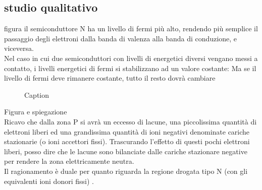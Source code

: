 \subsection{studio qualitativo}
figura
il semiconduttore N ha un livello di fermi più alto, rendendo più semplice il passaggio degli elettroni dalla banda di valenza alla banda di conduzione, e viceversa.\\
Nel caso in cui due semiconduttori con livelli di energetici diversi vengano messi a contatto, i livelli energetici di fermi si stabilizzano ad un valore costante:
Ma se il livello di fermi deve rimanere costante, tutto il resto dovrà cambiare\\
\begin{figure}[hbt!]
    \centering
    \caption{Caption}%
    \label{fig:enter_label}
\end{figure}
Figura e spiegazione\\
Ricavo che dalla zona P si avrà un eccesso di lacune, una piccolissima quantità di elettroni liberi ed una grandissima quantità di ioni negativi denominate cariche stazionarie (o ioni accettori fissi). Trascurando l'effetto di questi pochi elettroni liberi, posso dire che le lacune sono bilanciate dalle cariche stazionare negative per rendere la zona elettricamente neutra.\\
Il ragionamento è duale per quanto riguarda la regione drogata tipo N (con gli equivalenti ioni donori fissi) .\\

